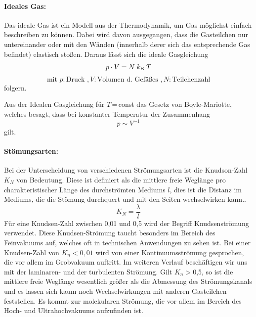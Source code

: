 \paragraph{Ideales Gas:}
Das ideale Gas ist ein Modell aus der Thermodynamik, um Gas möglichst einfach beschreiben zu
können. Dabei wird davon ausgegangen, dass die Gasteilchen nur untereinander oder mit den Wänden
(innerhalb derer sich das entsprechende Gas befindet) elastisch stoßen. Daraus lässt sich die ideale Gasgleichung
\begin{equation}
  p \cdot V = N \;k_\text{B}\;T \\
  \label{eqn:ideal}
\end{equation}
\begin{equation*}
  \text{mit }p:\text{Druck }, V:\text{Volumen d. Gefäßes }, N:\text{Teilchenzahl}
\end{equation*}
folgern.

Aus der Idealen Gasgleichung für $T\,$=$\,$const das Gesetz von Boyle-Mariotte, welches besagt,
dass bei konstanter Temperatur der Zusammenhang
\begin{equation}
  p \sim V^{-1}
\end{equation}
gilt.

\paragraph{Stömungsarten:}
Bei der Unterscheidung von verschiedenen Strömungsarten ist die Knudson-Zahl $K_N$ von
Bedeutung. Diese ist definiert als die mittlere freie Weglänge pro charakteristischer Länge des
durchströmten Mediums $l$, dies ist die Distanz im Mediums, die die Stömung durchquert und mit den
Seiten wechselwirken kann..
\begin{equation}
  K_N = \frac{\lambda}{l}
  \label{eqn:Knudsen}
\end{equation}
Für eine Knudsen-Zahl zwischen 0,01 und 0,5 wird der Begriff Knudsenströmung verwendet. Diese
Knudsen-Strömung taucht besonders im Bereich des Feinvakuums auf, welches oft in technischen Anwendungen
zu sehen ist.
Bei einer Knudsen-Zahl von $K_n < 0,01$ wird von einer Kontinuumsströmung gesprochen, die vor allem im
Grobvakuum auftritt. Im weiteren Verlauf beschäftigen wir uns mit der laminaren- und der turbulenten Strömung.
Gilt $K_n > $0,5, so ist die mittlere freie Weglänge wesentlich größer als die Abmessung des Strömungskanals
und es lassen sich kaum noch Wechselwirkungen mit anderen Gasteilchen feststellen. Es kommt zur molekularen
Strömung, die vor allem im Bereich des Hoch- und Ultrahochvakuums aufzufinden ist.

